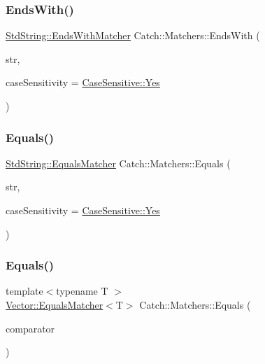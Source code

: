 \subsubsection{\texorpdfstring{EndsWith()}{EndsWith()}}
{\footnotesize\ttfamily \mbox{\hyperlink{struct_catch_1_1_matchers_1_1_std_string_1_1_ends_with_matcher}{Std\+String\+::\+Ends\+With\+Matcher}} Catch\+::\+Matchers\+::\+Ends\+With (\begin{DoxyParamCaption}\item[{std\+::string const \&}]{str,  }\item[{\mbox{\hyperlink{struct_catch_1_1_case_sensitive_aad49d3aee2d97066642fffa919685c6a}{Case\+Sensitive\+::\+Choice}}}]{case\+Sensitivity = {\ttfamily \mbox{\hyperlink{struct_catch_1_1_case_sensitive_aad49d3aee2d97066642fffa919685c6aa7c5550b69ec3c502e6f609b67f9613c6}{Case\+Sensitive\+::\+Yes}}} }\end{DoxyParamCaption})}

\mbox{\label{namespace_catch_1_1_matchers_af8af7dfc338335ed4c788cb1b37fc59f}} 
\subsubsection{\texorpdfstring{Equals()}{Equals()}\hspace{0.1cm}{\footnotesize\ttfamily [1/2]}}
{\footnotesize\ttfamily \mbox{\hyperlink{struct_catch_1_1_matchers_1_1_std_string_1_1_equals_matcher}{Std\+String\+::\+Equals\+Matcher}} Catch\+::\+Matchers\+::\+Equals (\begin{DoxyParamCaption}\item[{std\+::string const \&}]{str,  }\item[{\mbox{\hyperlink{struct_catch_1_1_case_sensitive_aad49d3aee2d97066642fffa919685c6a}{Case\+Sensitive\+::\+Choice}}}]{case\+Sensitivity = {\ttfamily \mbox{\hyperlink{struct_catch_1_1_case_sensitive_aad49d3aee2d97066642fffa919685c6aa7c5550b69ec3c502e6f609b67f9613c6}{Case\+Sensitive\+::\+Yes}}} }\end{DoxyParamCaption})}

\mbox{\label{namespace_catch_1_1_matchers_a332a401fb0da33c988e9cfa400ecce1b}} 
\subsubsection{\texorpdfstring{Equals()}{Equals()}\hspace{0.1cm}{\footnotesize\ttfamily [2/2]}}
{\footnotesize\ttfamily template$<$typename T $>$ \\
\mbox{\hyperlink{struct_catch_1_1_matchers_1_1_vector_1_1_equals_matcher}{Vector\+::\+Equals\+Matcher}}$<$T$>$ Catch\+::\+Matchers\+::\+Equals (\begin{DoxyParamCaption}\item[{std\+::vector$<$ T $>$ const \&}]{comparator }\end{DoxyParamCaption})}

